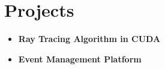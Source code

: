 \documentclass[letterpaper,11pt]{article}
\newcommand{\resumeItem}[2]{
  \item\small{
    \textbf{#1}{\\ #2 \vspace{-2pt}}
  }
}
\newcommand{\resumeSubItem}[2]{\resumeItem{#1}{#2}\vspace{-4pt}}
\newcommand{\resumeSubHeadingListStart}{\begin{itemize}[leftmargin=*]}
\newcommand{\resumeSubHeadingListEnd}{\end{itemize}}
\begin{document}
\section{Projects}
  \resumeSubHeadingListStart
    \resumeSubItem{Ray Tracing Algorithm in CUDA}
      {}
    \resumeSubItem{Event Management Platform}
      {}
  \resumeSubHeadingListEnd
\end{document}
